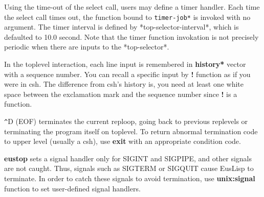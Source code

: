 Using the time-out of the select call, users may define a timer handler.
Each time the select call times out, the function
bound to {\tt *timer-job*} is invoked with no argument.
The timer interval is defined by *top-selector-interval*, which is 
defaulted to 10.0 second.
Note that the timer function invokation is not precisely periodic
when there are inputs to the *top-selector*.

In the toplevel interaction,
each line input is remembered in {\bf *history*} vector with a sequence
number.
You can recall a specific input by {\bf !} function
as if you were in csh.
The difference from csh's history is, you need at least one white space
between the exclamation mark and the sequence number since {\bf !}
is a function.

\verb+^+D (EOF) terminates the current reploop, going back to previous replevels or terminating the program itself on toplevel.
To return abnormal termination code to upper level (usually a csh),
use {\bf exit} with an appropriate condition code.

{\bf eustop} sets a signal handler only for SIGINT and SIGPIPE,
and other signals are not caught.
Thus, signals such as SIGTERM or SIGQUIT cause EusLisp to terminate.
In order to catch these signals to avoid termination,
use {\bf unix:signal} function to set user-defined signal handlers.

